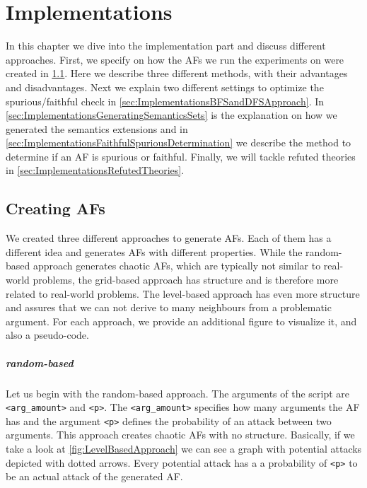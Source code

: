 \chapter{Implementations}
In this chapter we dive into the implementation part and discuss different approaches. First, we specify on how the AFs we run the experiments on were created in \cref{sec:ImplementationsCreatingAFs}. Here we describe three different methods, with their advantages and disadvantages. Next we explain two different settings to optimize the spurious/faithful check in \cref{sec:ImplementationsBFSandDFSApproach}. In \cref{sec:ImplementationsGeneratingSemanticsSets} is the explanation on how we generated the semantics extensions and in \cref{sec:ImplementationsFaithfulSpuriousDetermination} we describe the method to determine if an AF is spurious or faithful. Finally, we will tackle refuted theories in \cref{sec:ImplementationsRefutedTheories}.

\section{Creating AFs}
\label{sec:ImplementationsCreatingAFs}
We created three different approaches to generate AFs. Each of them has a different idea and generates AFs with different properties. While the random-based approach generates chaotic AFs, which are typically not similar to real-world problems, the grid-based approach has structure and is therefore more related to real-world problems. The level-based approach has even more structure and assures that we can not derive to many neighbours from a problematic argument. For each approach, we provide an additional figure to visualize it, and also a pseudo-code.

\paragraph{random-based} Let us begin with the random-based approach. The arguments of the script are \texttt{<arg\_amount>} and \texttt{<p>}. The \texttt{<arg\_amount>} specifies how many arguments the AF has and the argument \texttt{<p>} defines the probability of an attack between two arguments. This approach creates chaotic AFs with no structure. Basically, if we take a look at \cref{fig:LevelBasedApproach} we can see a graph with potential attacks depicted with dotted arrows. Every potential attack has a a probability of \texttt{<p>} to be an actual attack of the generated AF.


